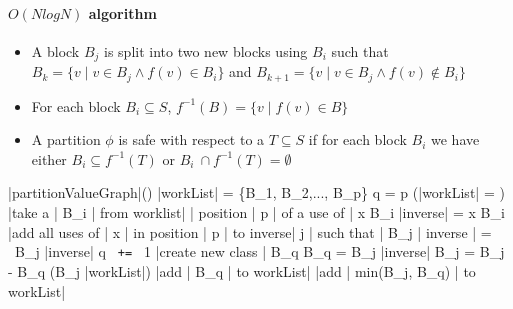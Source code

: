 \documentclass[a4paper,12pt, notitlepage]{article}
\newcommand{\negv}{\vspace{-0.7cm}}
\begin{document}
\paragraph*{$O(N log N)$ algorithm}
\begin{itemize}
\item A block $B_j$ is split into two new blocks using $B_i$ such that\\
$B_k = \{v \mid v \in B_j \land f(v) \in B_i\}$ and $B_{k+1} = \{v \mid v \in
B_j \land f(v) \not\in B_i\}$
\item For each block $B_i \subseteq S$, $f^{-1}(B) = \{v \mid f(v) \in B\}$
\item A partition $\phi$ is safe with respect to a $T \subseteq S$ if for each
block $B_i$ we have either $B_i \subseteq f^{-1}(T)$ or $B_i \ \cap f^{-1}(T) =
\emptyset$
\end{itemize}
\negv
\begin{program}
\PROC |partitionValueGraph|() \BODY
    |workList| = \{B_1, B_2,..., B_p\}
    q = p
    \WHILE (|workList| \not= \emptyset) \DO
        |take a | B_i | from worklist|
        \FOREACH | position | p | of a use of | x \in B_i \DO
            |inverse| = \emptyset
            \FOREACH x \in B_i \DO
                |add all uses of | x | in position | p | to inverse|
            \OD
            \FOREACH j | such that | B_j \cap | inverse | \not= \emptyset \land \ B_j \not\subseteq |inverse| \DO
                     q \texttt{ += } 1
                     |create new class | B_q
                     B_q = B_j \cap |inverse|
                     B_j = B_j - B_q
                     \IF (B_j \in |workList|)
                        |add | B_q | to workList|
                    \ELSE
                        |add | min(B_j, B_q) | to workList|
                    \FI
            \OD
        \OD
    \OD
\end{program}
\end{document}
